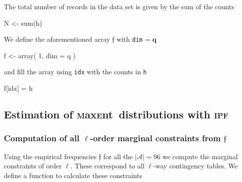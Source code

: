 \documentclass[
]{article}
\newenvironment{Shaded}{\begin{snugshade}}{\end{snugshade}}
\newcommand{\AttributeTok}[1]{\textcolor[rgb]{0.77,0.63,0.00}{#1}}
\newcommand{\DecValTok}[1]{\textcolor[rgb]{0.00,0.00,0.81}{#1}}
\newcommand{\FunctionTok}[1]{\textcolor[rgb]{0.00,0.00,0.00}{#1}}
\newcommand{\NormalTok}[1]{#1}
\newcommand{\OtherTok}[1]{\textcolor[rgb]{0.56,0.35,0.01}{#1}}
\newcommand{\abs}[1]{\left\vert#1\right\vert} %
\newcommand{\prob}[1]{\mathfrak{#1}}
\newcommand{\dimstatespace}{{\abs{\mathcal{A}}}}
\newcommand{\maxent}{\textsc{m}ax\textsc{e}nt~}
\newcommand{\ipf}{\textsc{ipf}~}
\begin{document}
The total number of records in the data set is given by the sum of the
counts

\begin{Shaded}
\begin{Highlighting}[]
\NormalTok{N }\OtherTok{\textless{}{-}} \FunctionTok{sum}\NormalTok{(h)}
\end{Highlighting}
\end{Shaded}

We define the aforementioned array \(\prob f\) with \texttt{dim} =
\(\mathbf q\)

\begin{Shaded}
\begin{Highlighting}[]
\NormalTok{f }\OtherTok{\textless{}{-}} \FunctionTok{array}\NormalTok{(}
  \DecValTok{1}\NormalTok{,}
  \AttributeTok{dim =}\NormalTok{ q}
\NormalTok{)}
\end{Highlighting}
\end{Shaded}

and fill the array using \texttt{idx} with the counts in \texttt{h}

\begin{Shaded}
\begin{Highlighting}[]
\NormalTok{f[idx] }\OtherTok{=}\NormalTok{ h}
\end{Highlighting}
\end{Shaded}

\hypertarget{estimation-of-distributions-with}{%
\subsection{\texorpdfstring{Estimation of \maxent distributions with
\ipf}{Estimation of distributions with }}\label{estimation-of-distributions-with}}

\hypertarget{computation-of-all-ell-order-marginal-constraints-from-prob-f}{%
\subsubsection{\texorpdfstring{Computation of all \(\ell\)-order
marginal constraints from
\(\prob f\)}{Computation of all \textbackslash ell-order marginal constraints from \textbackslash prob f}}\label{computation-of-all-ell-order-marginal-constraints-from-prob-f}}

Using the empirical frequencies \(\prob f\) for all the
\(\dimstatespace = 96\) we compute the marginal constraints of order
\(\ell\). These correspond to all \(\ell\)-way contingency tables. We
define a function to calculate these constraints
\end{document}
